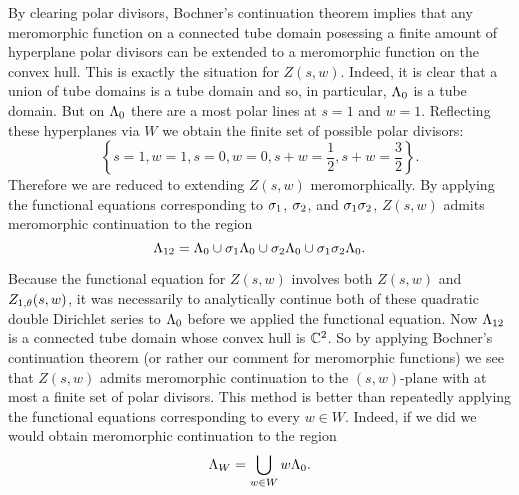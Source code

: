 \documentclass[12pt,reqno,oneside]{amsart}
\begin{document}
    By clearing polar divisors, Bochner's continuation theorem implies that any meromorphic function on a connected tube domain posessing a finite amount of hyperplane polar divisors can be extended to a meromorphic function on the convex hull. This is exactly the situation for $Z(s,w)$. Indeed, it is clear that a union of tube domains is a tube domain and so, in particular, $\Lambda_{0}$ is a tube domain. But on $\Lambda_{0}$ there are a most polar lines at $s = 1$ and $w = 1$. Reflecting these hyperplanes via $W$ we obtain the finite set of possible polar divisors:
    \[
        \left\{s = 1, w = 1, s = 0, w = 0, s+w = \frac{1}{2}, s+w = \frac{3}{2}\right\}.
    \]
    Therefore we are reduced to extending $Z(s,w)$ meromorphically. By applying the functional equations corresponding to $\sigma_{1}$, $\sigma_{2}$, and $\sigma_{1}\sigma_{2}$, $Z(s,w)$ admits meromorphic continuation to the region
    \[
        \Lambda_{12} = \Lambda_{0} \cup \sigma_{1}\Lambda_{0} \cup \sigma_{2}\Lambda_{0} \cup \sigma_{1}\sigma_{2}\Lambda_{0}.
    \]

    \begin{center}
    \end{center}

    Because the functional equation for $Z(s,w)$ involves both $Z(s,w)$ and $Z_{1,\theta}(s,w)$, it was necessarily to analytically continue both of these quadratic double Dirichlet series to $\Lambda_{0}$ before we applied the functional equation. Now $\Lambda_{12}$ is a connected tube domain whose convex hull is $\mathbb{C}^{2}$. So by applying Bochner's continuation theorem (or rather our comment for meromorphic functions) we see that $Z(s,w)$ admits meromorphic continuation to the $(s,w)$-plane with at most a finite set of polar divisors. This method is better than repeatedly applying the functional equations corresponding to every $w \in W$. Indeed, if we did we would obtain meromorphic continuation to the region
    \[
        \Lambda_{W} = \bigcup_{w \in W} w\Lambda_{0}.
    \]
\end{document}
